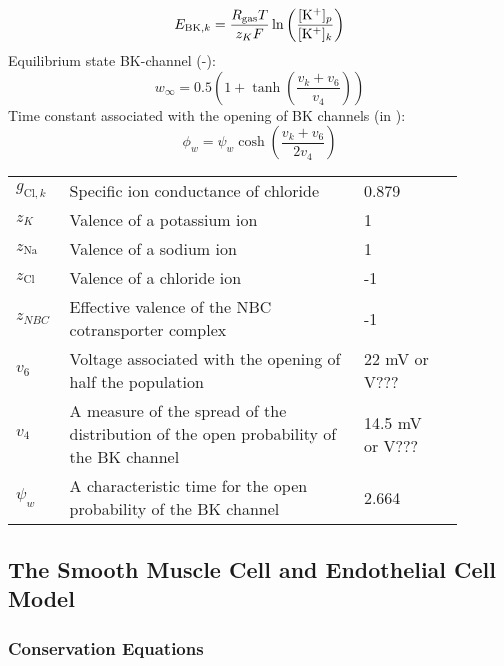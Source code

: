 \begin{equation} \label{eq:E_BK}
E_{\text{BK},k} = \frac{R_{\text{gas}} T}{z_K F}\ln\left( \frac{[\text{K$^+$}]_p}{[\text{K$^+$}]_k}\right) 
\end{equation}
%
Equilibrium state BK-channel (-):
\begin{equation} \label{eq:winf}
w_{\infty} = 0.5 \left(1+\tanh\left(\frac{v_{k}+v_{6} }{v_{4}} \right)  \right) 
\end{equation}
%
Time constant associated with the opening of BK channels	 (in \pers):
\begin{equation} \label{eq:phin}
\phi_{w} = \psi_{w}\cosh\left( \frac{v_{k}+v_{6}}{2v_{4}}\right) 
\end{equation}

\begin{table}[h!]
\centering
\begin{tabular}{ p{0.09\linewidth}  >{\footnotesize} p{0.6\linewidth}  >{\footnotesize} p{0.17\linewidth} >{\footnotesize} p{0.03\linewidth} }
\hline
$g_{\text{Cl},k}$ 		& Specific ion conductance of chloride 									& 0.879 \perOhmm & \cite{Ostby2009}  \\
$z_K$			& Valence of a potassium ion										& 1   & \\ 
$z_{\text{Na}}$			& Valence of a sodium ion											& 1   & \\ 
$z_{\text{Cl}}$			& Valence of a chloride ion											& -1  & \\ 
$z_{NBC}$ 		& Effective valence of the NBC cotransporter complex 				& -1 & \\
$v_{6}$			& Voltage associated with the opening of half the population		& 22 mV or V???  & \cite{GonzalezFernandez1994}  \\
$v_{4}$			& A measure of the spread of the distribution of the open probability of the BK channel	& 14.5 mV or V???  &  \cite{GonzalezFernandez1994}  
\\
$ \psi_{w}$    	& A characteristic time for the open probability of the BK channel		& 2.664 \pers & \cite{GonzalezFernandez1994} \\
\hline
\end{tabular}
\end{table}

\subsection{The Smooth Muscle Cell and Endothelial Cell Model}\label{sec:EqSMCEC}

\subsubsection*{Conservation Equations}

